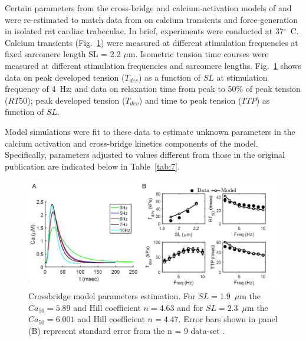 \documentclass[fleqn,10pt]{physiome}
\begin{document}
Certain parameters from the cross-bridge and calcium-activation models of \cite{Tewari2016a,Tewari2016b} and \cite{Campbell2018} were re-estimated to match data from \cite{Janssen2002} on calcium transients and force-generation in isolated rat cardiac trabeculae. In brief, experiments were conducted at 37$^\circ$~C. Calcium transients (Fig.~\ref{fig:calcium}) were measured at different stimulation frequencies at fixed sarcomere length SL = 2.2 $\mu$m. Isometric tension time courses were measured at different stimulation frequencies and sarcomere lengths. Fig.~\ref{fig:calcium} shows data on peak developed tension ($T_{dev}$) as a function of $SL$ at stimulation frequency of 4~Hz; and data on relaxation time from peak to 50\% of peak tension ($RT50$); peak developed tension ($T_{dev}$) and time to peak tension ($TTP$) as function of $SL$.

Model simulations were fit to these data to estimate unknown parameters in the calcium activation and cross-bridge kinetics components of the model. Specifically, parameters adjusted to values different from those in the original publication are indicated below in Table~\ref{tab:7}.

\begin{figure}[ht]\centering
\includegraphics[width=1.0\linewidth]{CrossBridgeParaEstimate.jpg}
\caption{Crossbridge model parameters estimation. For $SL =1.9$~$\mu$m the $Ca_{50} = 5.89$ and Hill coefficient $n = 4.63$ and for $SL = 2.3$~$\mu$m the $Ca_{50} =6.001$ and Hill coefficient $n = 4.47$. Error bars shown in panel (B) represent standard error from the n = 9 data-set \cite{Janssen2002}.}
\label{fig:calcium}
\end{figure}
\end{document}
